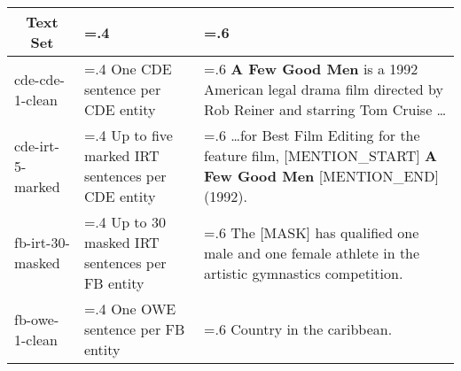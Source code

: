 \begin{tabularx}{\textwidth}{| l | >{\hsize=.4\hsize}X | >{\hsize=.6\hsize}X |}
    \hline
    
    \multicolumn{1}{|c|}{\textbf{Text Set}} &
    \multicolumn{1}{|c|}{\textbf{Description}} &
    \multicolumn{1}{|c|}{\textbf{Example}} \\ 
    
    \hline \hline
    
    cde-cde-1-clean & One CDE sentence per CDE entity &
    \textbf{A Few Good Men} is a 1992 American legal drama film directed by Rob Reiner and starring Tom Cruise \dots \\ \hline
    
    cde-irt-5-marked & Up to five marked IRT sentences per CDE entity &
    \dots for Best Film Editing for the feature film, [MENTION\_START] \textbf{A Few Good Men} [MENTION\_END] (1992). \\ \hline
    
    fb-irt-30-masked & Up to 30 masked IRT sentences per FB entity &
    The [MASK] has qualified one male and one female athlete in the artistic gymnastics competition. \\ \hline
    
    fb-owe-1-clean & One OWE sentence per FB entity &
    Country in the caribbean. \\ \hline

\end{tabularx}
